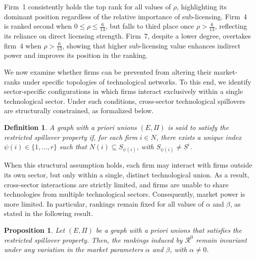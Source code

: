 \documentclass[preprint,11pt,authoryear]{elsarticle}
\theoremstyle{plain}
\newtheorem{definition}[theorem]{Definition}
\newtheorem{proposition}[theorem]{Proposition}
\begin{document}
Firm~1 consistently holds the top rank for all values of \( \rho \), highlighting its dominant position regardless of the relative importance of sub-licensing. Firm~4 is ranked second when \( 0 \leq \rho \leq \frac{6}{13} \), but falls to third place once \( \rho > \frac{6}{13} \), reflecting its reliance on direct licensing strength.
Firm~7, despite a lower degree, overtakes firm~4 when \( \rho > \frac{6}{13} \), showing that higher sub-licensing value enhances indirect power and improves its position in the ranking.

We now examine whether firms can be prevented from altering their market-ranks under specific topologies of technological networks. To this end, we identify sector-specific configurations in which firms interact exclusively within a single technological sector. Under such conditions, cross-sector technological spillovers are structurally constrained, as formalized below.
\begin{definition}
A graph with \emph{a priori} unions \( (E, \Pi) \) is said to satisfy the \emph{restricted spillover property} if, for each firm \( i \in N \), there exists a unique index \( \psi(i) \in \{1, \dots, r\} \) such that \( N(i) \subseteq S_{\psi(i)} \), with \( S_{\psi(i)} \neq S^i \).
\end{definition}
When this structural assumption holds, each firm may interact with firms outside its own sector, but only within a single, distinct technological union. As a result, cross-sector interactions are strictly limited, and firms are unable to share technologies from multiple technological sectors. Consequently, market power is more limited. In particular, rankings remain fixed for all values of \( \alpha \) and \( \beta \), as stated in the following result.
\begin{proposition}
\label{prop29}
Let \( (E, \Pi) \) be a graph with a priori unions that satisfies the restricted spillover property. Then, the rankings induced by \( \mathcal{R}^{0} \) remain invariant under any variation in the market parameters \( \alpha \) and \( \beta \), with $\alpha\neq 0$.
\end{proposition}
\end{document}
